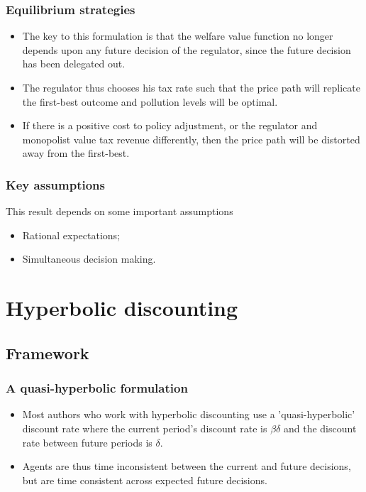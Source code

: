 \documentclass{beamer}
\begin{document}
\begin{frame}
  \frametitle{Equilibrium strategies}
  \begin{itemize}
  \item<1-> The key to this formulation is that the welfare value
    function no longer depends upon any future decision of the
    regulator, since the future decision has been delegated out.
  \item<2-> The regulator thus chooses his tax rate such that the
    price path will replicate the first-best outcome and pollution
    levels will be optimal.
  \item<3-> If there is a positive cost to policy adjustment, or the
    regulator and monopolist value tax revenue differently, then the
    price path will be distorted away from the first-best.
  \end{itemize}
\end{frame}

\begin{frame}
  \frametitle{Key assumptions}
  This result depends on some important assumptions
  \begin{itemize}
  \item<1-> Rational expectations;
  \item<2-> Simultaneous decision making.
  \end{itemize}
\end{frame}


\section{Hyperbolic discounting}

\subsection{Framework}

\begin{frame}
  \frametitle{A quasi-hyperbolic formulation}
  \begin{itemize}
  \item<1-> Most authors who work with hyperbolic discounting use a
    'quasi-hyperbolic' discount rate where the current period's
    discount rate is $\beta\delta$ and the discount rate between
    future periods is $\delta$.
  \item<2-> Agents are thus time inconsistent between the current and
    future decisions, but are time consistent across expected future decisions.
  \end{itemize}
\end{frame}
\end{document}
